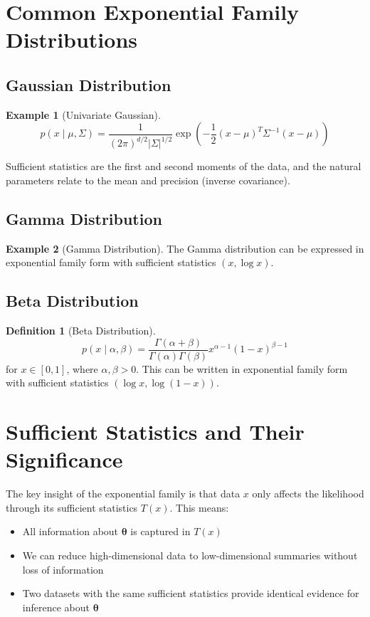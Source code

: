 \documentclass[12pt,a4paper]{article}
\theoremstyle{definition}
\newtheorem{definition}{Definition}[section]
\newtheorem{example}{Example}[section]
\begin{document}
\section{Common Exponential Family Distributions}

\subsection{Gaussian Distribution}

\begin{example}[Univariate Gaussian]
\[
p(x \mid \mu, \Sigma) = \frac{1}{(2\pi)^{d/2} |\Sigma|^{1/2}} \exp\left(-\frac{1}{2}(x - \mu)^T \Sigma^{-1} (x - \mu)\right)
\]

Sufficient statistics are the first and second moments of the data, and the natural parameters relate to the mean and precision (inverse covariance).
\end{example}

\subsection{Gamma Distribution}

\begin{example}[Gamma Distribution]
The Gamma distribution can be expressed in exponential family form with sufficient statistics $(x, \log x)$.
\end{example}

\subsection{Beta Distribution}

\begin{definition}[Beta Distribution]
\[
p(x \mid \alpha, \beta) = \frac{\Gamma(\alpha + \beta)}{\Gamma(\alpha)\Gamma(\beta)} x^{\alpha-1}(1-x)^{\beta-1}
\]
for $x \in [0,1]$, where $\alpha, \beta > 0$. This can be written in exponential family form with sufficient statistics $(\log x, \log(1-x))$.
\end{definition}

\section{Sufficient Statistics and Their Significance}

The key insight of the exponential family is that data $x$ only affects the likelihood through its sufficient statistics $T(x)$. This means:
\begin{itemize}
    \item All information about $\boldsymbol{\theta}$ is captured in $T(x)$
    \item We can reduce high-dimensional data to low-dimensional summaries without loss of information
    \item Two datasets with the same sufficient statistics provide identical evidence for inference about $\boldsymbol{\theta}$
\end{itemize}
\end{document}
